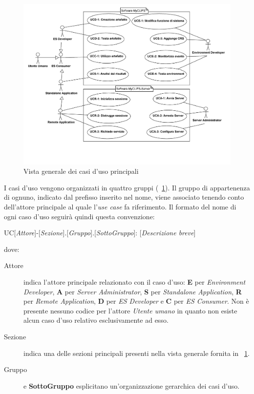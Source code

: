\begin{figure}
\centering
\includegraphics[width=1.2\textwidth, angle=270]{Immagini/Capitolo2/UseCases/Vista-generale.png}
\caption{Vista generale dei casi d'uso principali}\label{fig:uc-vista-generale}
\end{figure}


I casi d'uso vengono organizzati in quattro gruppi  (\figurename~\ref{fig:uc-vista-generale}). Il gruppo di appartenenza di ognuno, indicato dal prefisso inserito nel nome, viene associato tenendo conto dell'attore principale al quale l'\emph{use case} fa riferimento. Il formato del nome di ogni caso d'uso seguirà quindi questa convenzione:
\begin{center}
UC[\emph{Attore}]-[\emph{Sezione}].[\emph{Gruppo}].[\emph{SottoGruppo}]: [\emph{Descrizione breve}]
\end{center}
dove:


\begin{description}
	\item[Attore] indica l'attore principale relazionato con il caso d'uso: \textbf{E} per \emph{Environment Developer}, \textbf{A} per \emph{Server Administrator}, \textbf{S} per \emph{Standalone Application}, \textbf{R} per \emph{Remote Application}, \textbf{D} per \emph{ES Developer} e \textbf{C} per \emph{ES Consumer}. Non è presente nessuno codice per l'attore \emph{Utente umano} in quanto non esiste alcun caso d'uso relativo esclusivamente ad esso.

	\item[Sezione] indica una delle sezioni principali presenti nella vista generale fornita in \figurename~\ref{fig:uc-vista-generale}.
	
	\item[Gruppo] e \textbf{SottoGruppo} esplicitano un'organizzazione gerarchica dei casi d'uso.

\end{description}

